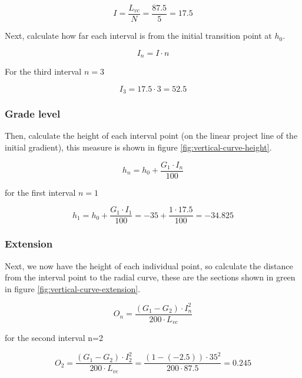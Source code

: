 \documentclass{bcrre_exam}
\begin{document}
\begin{equation}
    I = \frac{L_{vc}}{N} = \frac{87.5}{5} = 17.5
\end{equation}

Next, calculate how far each interval is from the initial transition point at $h_0$.

\begin{equation}
    I_n = I \cdot n
\end{equation}

For the third interval $n=3$

\begin{equation}
    I_3 = 17.5 \cdot 3 = 52.5
\end{equation}

\subsubsection*{Grade level}

Then, calculate the height of each interval point (on the linear project line of the initial gradient), this measure is shown in figure \ref{fig:vertical-curve-height}.

\begin{equation}
    h_n=h_0+\frac{G_1 \cdot I_n}{100}
\end{equation}

for the first interval $n=1$ 

\begin{equation}
    h_1=h_0+\frac{G_1 \cdot I_1}{100}=-35+\frac{1 \cdot 17.5}{100} = -34.825
\end{equation}

\subsubsection*{Extension}

Next, we now have the height of each individual point, so calculate the distance from the interval point to the radial curve, these are the sections shown in green in figure \ref{fig:vertical-curve-extension}.

\begin{equation}
    O_n=\frac{(G_1-G_2) \cdot I_n^2}{200 \cdot L_{vc}}
\end{equation}

for the second interval n=2

\begin{equation}
    O_2=\frac{(G_1-G_2) \cdot I_2^2}{200 \cdot L_{vc}} = \frac{(1-(-2.5)) \cdot 35^2}{200 \cdot 87.5} = 0.245
\end{equation}
\end{document}
